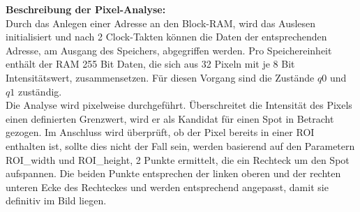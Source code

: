 \documentclass{minimal}
\begin{document}
\textbf{Beschreibung der Pixel-Analyse:}\\
Durch das Anlegen einer Adresse an den Block-RAM, wird das Auslesen initialisiert und nach 2 Clock-Takten können die Daten der entsprechenden Adresse, am Ausgang des Speichers,  abgegriffen werden.
Pro Speichereinheit enthält der RAM 255 Bit Daten, die sich aus 32 Pixeln mit je 8 Bit Intensitätswert, zusammensetzen. Für diesen Vorgang sind die Zustände $q0$ und $q1$ zuständig.\\
Die Analyse wird pixelweise durchgeführt. Überschreitet die Intensität des Pixels einen definierten Grenzwert, wird er als Kandidat für einen Spot in Betracht gezogen. Im Anschluss wird überprüft, ob der Pixel bereits in einer ROI enthalten ist, sollte dies nicht der Fall sein, werden basierend auf den Parametern ROI\_width und ROI\_height, 2 Punkte ermittelt, die ein Rechteck um den Spot aufspannen. Die beiden Punkte entsprechen der linken oberen und der rechten unteren Ecke des Rechteckes und werden entsprechend angepasst, damit sie definitiv im Bild liegen.

\end{document}
